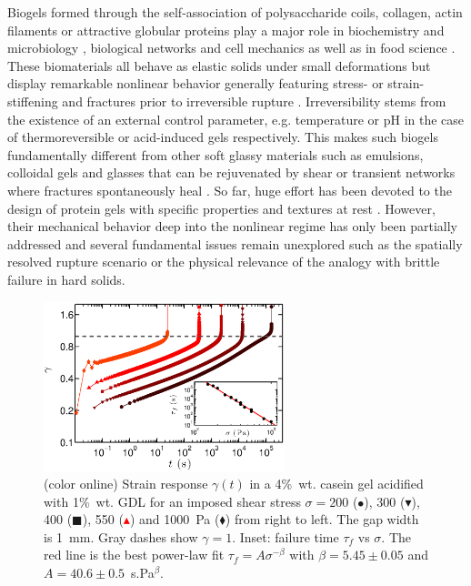 \documentclass[twocolumn,superscriptaddress,showpacs,preprintnumbers,amsmath,amssymb,prl]{revtex4}
\begin{document}
Biogels formed through the self-association of polysaccharide coils, collagen, actin filaments or attractive globular proteins play a major role in biochemistry and microbiology \cite{Viovy:2000}, biological networks and cell mechanics \cite{Stricker:2010} as well as in food science \cite{Mezzenga:2005}. These biomaterials all behave as elastic solids under small deformations but display remarkable nonlinear behavior generally featuring stress- or strain-stiffening \cite{Gardel:2004} and fractures prior to irreversible rupture \cite{Bonn:1998,Baumberger:2006}. Irreversibility stems from the existence of an external control parameter, e.g. temperature or pH in the case of thermoreversible or acid-induced gels respectively. This makes such biogels fundamentally different from other soft glassy materials such as emulsions, colloidal gels and glasses that can be rejuvenated by shear \cite{Cloitre:2000,Caton:2008,Divoux:2011,Siebenburger:2012} or transient networks where fractures spontaneously heal \cite{Tabuteau:2009,Skrzeszewska:2010}. So far, huge effort has been devoted to the design of protein gels with specific properties and textures at rest \cite{Dickinson:2006,Gibaud:2012}. However, their mechanical behavior deep into the nonlinear regime has only been partially addressed \cite{vanVliet:1995,Pouzot:2006} and several fundamental issues remain unexplored such as the spatially resolved rupture scenario or the physical relevance of the analogy with brittle failure in hard solids.

\begin{figure}
\centering
\includegraphics[width=7cm]{Fig1.eps}
\caption{(color online) Strain response $\gamma(t)$ in a 4\%~wt. casein gel acidified with 1\%~wt. GDL for an imposed shear stress $\sigma=200$ (\textcolor{red!25!black}{$\bullet$}), 300 (\textcolor{red!50!black}{$\blacktriangledown$}), 400 (\textcolor{red!75!black}{$\blacksquare$}), 550 (\textcolor{red}{$\blacktriangle$}) and 1000~Pa (\textcolor{orange!50!red}{$\blacklozenge$}) from right to left. The gap width is 1~mm. Gray dashes show $\gamma=1$. Inset: failure time $\tau_f$ vs $\sigma$. The red line is the best power-law fit $\tau_f=A\sigma^{-\beta}$ with $\beta=5.45\pm 0.05$ and $A=40.6\pm 0.5$~s.Pa$^\beta$.
\label{fig1}}
\end{figure} 
\end{document}
